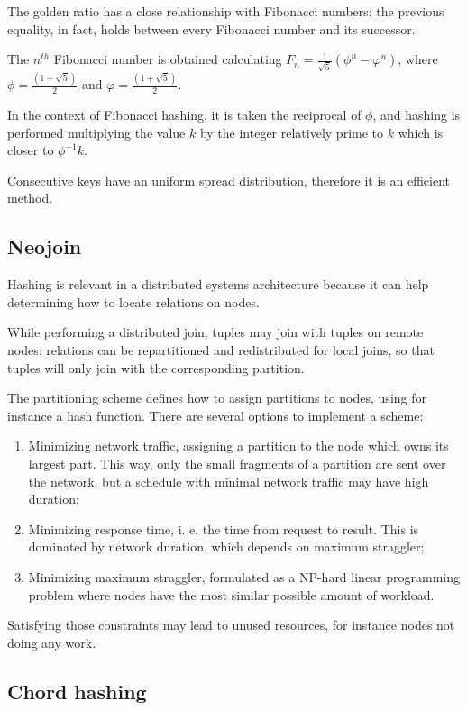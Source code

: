 The golden ratio has a close relationship with Fibonacci numbers: the previous equality, in fact, holds between every Fibonacci number and its successor.

The $n^{th}$ Fibonacci number is obtained calculating $F_n = \frac{1}{\sqrt{5}}(\phi^n - \varphi^n)$, where $\phi = \frac{(1 + \sqrt{5})}{2}$ and $\varphi = \frac{(1 + \sqrt{5})}{2}$.

In the context of Fibonacci hashing, it is taken the reciprocal of $\phi$, and hashing is performed multiplying the value $k$ by the integer relatively prime to $k$ which is closer to $\phi^{-1}k$. 

Consecutive keys have an uniform spread distribution, therefore it is an efficient method.

\subsection{Neojoin}
Hashing is relevant in a distributed systems architecture because it can help determining how to locate relations on nodes.

While performing a distributed join, tuples may join with tuples on remote nodes: relations can be repartitioned and redistributed for local joins, so that tuples will only join with the corresponding partition.

The partitioning scheme defines how to assign partitions to nodes, using for instance a hash function. There are several options to implement a scheme:
\begin{enumerate}
	\item Minimizing network traffic, assigning a partition to the node which owns its largest part. This way, only the small fragments of a partition are sent over the network, but a schedule with minimal network traffic may have high duration;
	\item Minimizing response time, i. e. the time from request to result. This is dominated by network duration, which depends on maximum straggler;
	\item Minimizing maximum straggler, formulated as a NP-hard linear programming problem where nodes have the most similar possible amount of workload.
\end{enumerate}

Satisfying those constraints may lead to unused resources, for instance nodes not doing any work.

\subsection{Chord hashing}






